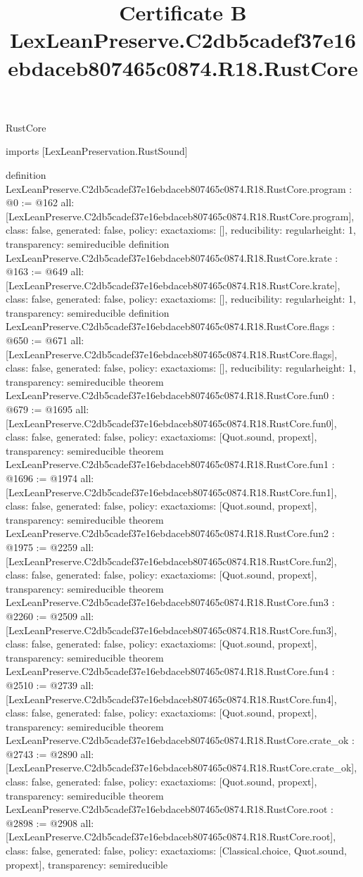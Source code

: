 \begin{lexlean}{RustCore}
\title{Certificate B LexLeanPreserve.C2db5cadef37e16ebdaceb807465c0874.R18.RustCore}
\begin{coremodule}
imports [LexLeanPreservation.RustSound]

definition LexLeanPreserve.C2db5cadef37e16ebdaceb807465c0874.R18.RustCore.program : @0 := @162 {
  all: [LexLeanPreserve.C2db5cadef37e16ebdaceb807465c0874.R18.RustCore.program],
  class: false,
  generated: false,
  policy: exact{axioms: []},
  reducibility: regular{height: 1},
  transparency: semireducible
}
definition LexLeanPreserve.C2db5cadef37e16ebdaceb807465c0874.R18.RustCore.krate : @163 := @649 {
  all: [LexLeanPreserve.C2db5cadef37e16ebdaceb807465c0874.R18.RustCore.krate],
  class: false,
  generated: false,
  policy: exact{axioms: []},
  reducibility: regular{height: 1},
  transparency: semireducible
}
definition LexLeanPreserve.C2db5cadef37e16ebdaceb807465c0874.R18.RustCore.flags : @650 := @671 {
  all: [LexLeanPreserve.C2db5cadef37e16ebdaceb807465c0874.R18.RustCore.flags],
  class: false,
  generated: false,
  policy: exact{axioms: []},
  reducibility: regular{height: 1},
  transparency: semireducible
}
theorem LexLeanPreserve.C2db5cadef37e16ebdaceb807465c0874.R18.RustCore.fun0 : @679 := @1695 {
  all: [LexLeanPreserve.C2db5cadef37e16ebdaceb807465c0874.R18.RustCore.fun0],
  class: false,
  generated: false,
  policy: exact{axioms: [Quot.sound, propext]},
  transparency: semireducible
}
theorem LexLeanPreserve.C2db5cadef37e16ebdaceb807465c0874.R18.RustCore.fun1 : @1696 := @1974 {
  all: [LexLeanPreserve.C2db5cadef37e16ebdaceb807465c0874.R18.RustCore.fun1],
  class: false,
  generated: false,
  policy: exact{axioms: [Quot.sound, propext]},
  transparency: semireducible
}
theorem LexLeanPreserve.C2db5cadef37e16ebdaceb807465c0874.R18.RustCore.fun2 : @1975 := @2259 {
  all: [LexLeanPreserve.C2db5cadef37e16ebdaceb807465c0874.R18.RustCore.fun2],
  class: false,
  generated: false,
  policy: exact{axioms: [Quot.sound, propext]},
  transparency: semireducible
}
theorem LexLeanPreserve.C2db5cadef37e16ebdaceb807465c0874.R18.RustCore.fun3 : @2260 := @2509 {
  all: [LexLeanPreserve.C2db5cadef37e16ebdaceb807465c0874.R18.RustCore.fun3],
  class: false,
  generated: false,
  policy: exact{axioms: [Quot.sound, propext]},
  transparency: semireducible
}
theorem LexLeanPreserve.C2db5cadef37e16ebdaceb807465c0874.R18.RustCore.fun4 : @2510 := @2739 {
  all: [LexLeanPreserve.C2db5cadef37e16ebdaceb807465c0874.R18.RustCore.fun4],
  class: false,
  generated: false,
  policy: exact{axioms: [Quot.sound, propext]},
  transparency: semireducible
}
theorem LexLeanPreserve.C2db5cadef37e16ebdaceb807465c0874.R18.RustCore.crate_ok : @2743 := @2890 {
  all: [LexLeanPreserve.C2db5cadef37e16ebdaceb807465c0874.R18.RustCore.crate_ok],
  class: false,
  generated: false,
  policy: exact{axioms: [Quot.sound, propext]},
  transparency: semireducible
}
theorem LexLeanPreserve.C2db5cadef37e16ebdaceb807465c0874.R18.RustCore.root : @2898 := @2908 {
  all: [LexLeanPreserve.C2db5cadef37e16ebdaceb807465c0874.R18.RustCore.root],
  class: false,
  generated: false,
  policy: exact{axioms: [Classical.choice, Quot.sound, propext]},
  transparency: semireducible
}


\end{coremodule}
\end{lexlean}
